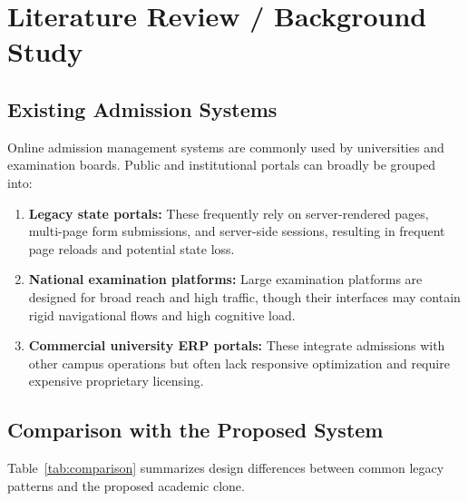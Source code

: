 \documentclass[12pt,a4paper,oneside]{report}
\begin{document}
\chapter{Literature Review / Background Study}

\section{Existing Admission Systems}
Online admission management systems are commonly used by universities and examination boards. Public and institutional portals can broadly be grouped into:
\begin{enumerate}
    \item \textbf{Legacy state portals:} These frequently rely on server-rendered pages, multi-page form submissions, and server-side sessions, resulting in frequent page reloads and potential state loss.
    \item \textbf{National examination platforms:} Large examination platforms are designed for broad reach and high traffic, though their interfaces may contain rigid navigational flows and high cognitive load.
    \item \textbf{Commercial university ERP portals:} These integrate admissions with other campus operations but often lack responsive optimization and require expensive proprietary licensing.
\end{enumerate}

\section{Comparison with the Proposed System}
Table~\ref{tab:comparison} summarizes design differences between common legacy patterns and the proposed academic clone.
\end{document}
